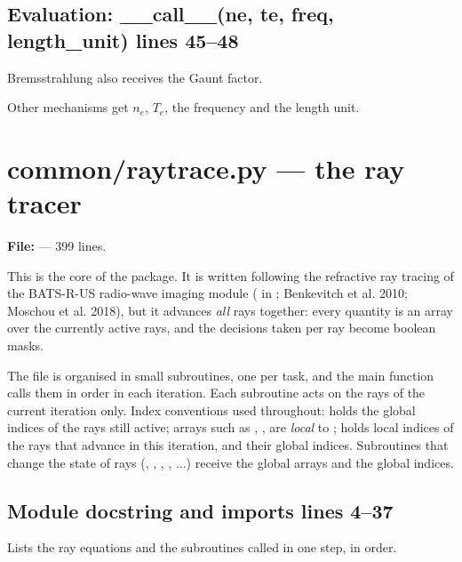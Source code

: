 \section*{\normalsize Evaluation: \_\_call\_\_(ne, te, freq, length\_unit) \hfill{\small\mdseries\color{gray}lines 45--48}}

\begin{lines}
\item[L.46] Bremsstrahlung also receives the Gaunt factor.
\item[L.48] Other mechanisms get $n_e$, $T_e$, the frequency and the length unit.
\end{lines}

\chapter{common/raytrace.py --- the ray tracer}
\label{mod:common:raytrace.py}
\textbf{File:}  --- 399 lines.

This is the core of the package. It is written following the refractive ray tracing of
the BATS-R-US radio-wave imaging module ( in ;
Benkevitch et al. 2010; Moschou et al. 2018), but it advances \emph{all} rays together:
every quantity is an array over the currently active rays, and the decisions taken per ray
become boolean masks.

The file is organised in small subroutines, one per task, and the main function
 calls them in order in each iteration. Each subroutine acts on the rays of the
current iteration only. Index conventions used throughout:  holds the global indices of
the rays still active; arrays such as , ,  are \emph{local} to ; 
holds local indices of the rays that advance in this iteration, and  their
global indices. Subroutines that change the state of rays (, , ,
, ...) receive the global arrays and the global indices.

\section*{\normalsize Module docstring and imports \hfill{\small\mdseries\color{gray}lines 4--37}}

Lists the ray equations and the subroutines called in one step, in order.

